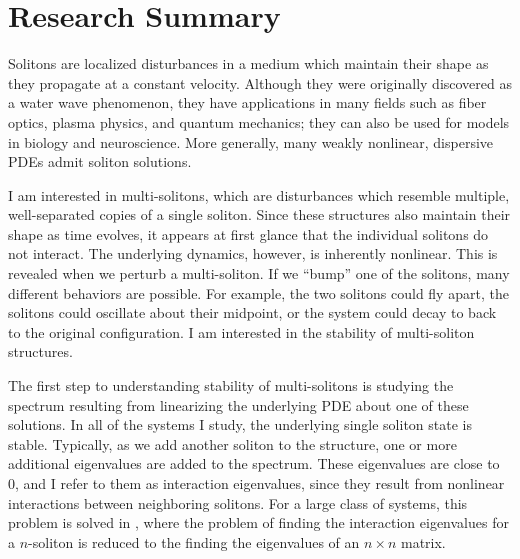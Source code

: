 \documentclass[12pt,reqno]{amsart}
\theoremstyle{definition}
\theoremstyle{remark}
\begin{document}
\section{Research Summary}

Solitons are localized disturbances in a medium which maintain their shape as they propagate at a constant velocity. Although they were originally discovered as a water wave phenomenon, they have applications in many fields such as fiber optics, plasma physics, and quantum mechanics; they can also be used for models in biology and neuroscience. More generally, many weakly nonlinear, dispersive PDEs admit soliton solutions.

I am interested in multi-solitons, which are disturbances which resemble multiple, well-separated copies of a single soliton. Since these structures also maintain their shape as time evolves, it appears at first glance that the individual solitons do not interact. The underlying dynamics, however, is inherently nonlinear. This is revealed when we perturb a multi-soliton. If we ``bump'' one of the solitons, many different behaviors are possible. For example, the two solitons could fly apart, the solitons could oscillate about their midpoint, or the system could decay to back to the original configuration. I am interested in the stability of multi-soliton structures.

The first step to understanding stability of multi-solitons is studying the spectrum resulting from linearizing the underlying PDE about one of these solutions. In all of the systems I study, the underlying single soliton state is stable. Typically, as we add another soliton to the structure, one or more additional eigenvalues are added to the spectrum. These eigenvalues are close to 0, and I refer to them as interaction eigenvalues, since they result from nonlinear interactions between neighboring solitons. For a large class of systems, this problem is solved in \cite{Sandstede1998}, where the problem of finding the interaction eigenvalues for a $n$-soliton is reduced to the finding the eigenvalues of an $n \times n$ matrix.
\end{document}
